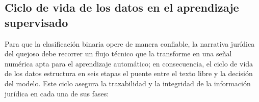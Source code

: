 \subsection{Ciclo de vida de los datos en el aprendizaje supervisado}

Para que la clasificación binaria opere de manera confiable, la narrativa jurídica
del quejoso debe recorrer un flujo técnico que la transforme en una señal numérica
apta para el aprendizaje automático; en consecuencia, el ciclo de vida de los
datos estructura en seis etapas el puente entre el texto libre y la decisión del
modelo. Este ciclo asegura la trazabilidad y la integridad de la información
jurídica en cada una de sus fases:


